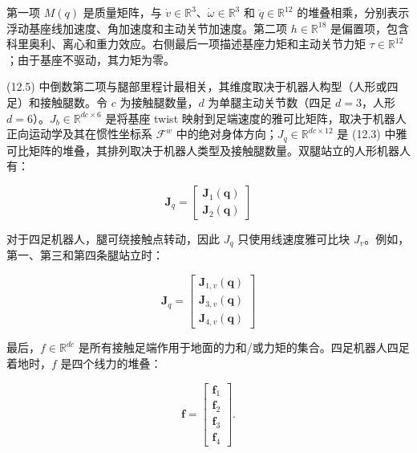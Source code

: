 第一项 $M(q)$ 是质量矩阵，与 $\dot v\in\mathbb{R}^3$、$\dot\omega\in\mathbb{R}^3$ 和 $\ddot q\in\mathbb{R}^{12}$ 的堆叠相乘，分别表示浮动基座线加速度、角加速度和主动关节加速度。第二项 $h\in\mathbb{R}^{18}$ 是偏置项，包含科里奥利、离心和重力效应。右侧最后一项描述基座力矩和主动关节力矩 $\tau\in\mathbb{R}^{12}$；由于基座不驱动，其力矩为零。

(12.5) 中倒数第二项与腿部里程计最相关，其维度取决于机器人构型（人形或四足）和接触腿数。令 $c$ 为接触腿数量，$d$ 为单腿主动关节数（四足 $d=3$，人形 $d=6$）。$J_b\in\mathbb{R}^{dc\times6}$ 是将基座 twist 映射到足端速度的雅可比矩阵，取决于机器人正向运动学及其在惯性坐标系 $\mathcal{F}^w$ 中的绝对身体方向；$J_q\in\mathbb{R}^{dc\times12}$ 是 (12.3) 中雅可比矩阵的堆叠，其排列取决于机器人类型及接触腿数量。双腿站立的人形机器人有：

\begin{equation}
\boldsymbol {J} _ {q} = \left[ \begin{array}{c} \boldsymbol {J} _ {1} (\boldsymbol {q}) \\ \boldsymbol {J} _ {2} (\boldsymbol {q}) \end{array} \right]\tag{12.6}
\end{equation}

对于四足机器人，腿可绕接触点转动，因此 $J_q$ 只使用线速度雅可比块 $J_v$。例如，第一、第三和第四条腿站立时：

\begin{equation}
\boldsymbol {J} _ {q} = \left[ \begin{array}{c} \boldsymbol {J} _ {1, v} (\boldsymbol {q}) \\ \boldsymbol {J} _ {3, v} (\boldsymbol {q}) \\ \boldsymbol {J} _ {4, v} (\boldsymbol {q}) \end{array} \right]\tag{12.7}
\end{equation}

最后，$f\in\mathbb{R}^{dc}$ 是所有接触足端作用于地面的力和/或力矩的集合。四足机器人四足着地时，$f$ 是四个线力的堆叠：

\begin{equation}
\boldsymbol {f} = \left[ \begin{array}{c} \boldsymbol {f} _ {1} \\ \boldsymbol {f} _ {2} \\ \boldsymbol {f} _ {3} \\ \boldsymbol {f} _ {4} \end{array} \right].\tag{12.8}
\end{equation}

